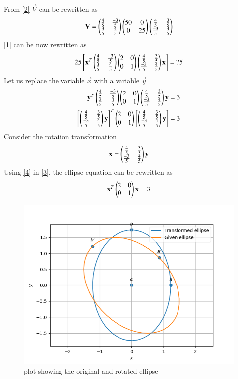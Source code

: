 \documentclass[journal,12pt,twocolumn]{IEEEtran}
\begin{document}
From \eqref{2} $\vec{V}$ can be rewritten as
\begin{align}
    \mathbf{V}=\begin{pmatrix}\frac{4}{5}&\frac{-3}{5}\\ \frac{3}{5}&\frac{4}{5}\end{pmatrix}\begin{pmatrix}50&0\\0&25\end{pmatrix}\begin{pmatrix}\frac{4}{5}&\frac{3}{5}\\ \frac{-3}{5}&\frac{4}{5}\end{pmatrix}
\end{align}
\eqref{1} can be now rewritten as
\begin{align}
25\left[\mathbf{x}^T\begin{pmatrix}\frac{4}{5}&\frac{-3}{5}\\ \frac{3}{5}&\frac{4}{5}\end{pmatrix}\begin{pmatrix}2&0\\0&1\end{pmatrix}\begin{pmatrix}\frac{4}{5}&\frac{3}{5}\\ \frac{-3}{5}&\frac{4}{5}\end{pmatrix}\mathbf{x}\right]=75
\end{align}
Let us replace the variable $\vec{x}$ with a variable $\vec{y}$
\begin{align}
  \mathbf{y}^T\begin{pmatrix}\frac{4}{5}&\frac{-3}{5}\\ \frac{3}{5}&\frac{4}{5}\end{pmatrix}\begin{pmatrix}2&0\\0&1\end{pmatrix}\begin{pmatrix}\frac{4}{5}&\frac{3}{5}\\ \frac{-3}{5}&\frac{4}{5}\end{pmatrix}\mathbf{y}= 3 \\
  \left[\begin{pmatrix}\frac{4}{5}&\frac{3}{5}\\ \frac{-3}{5}&\frac{4}{5}\end{pmatrix}\mathbf{y}\right]^T\begin{pmatrix}2&0\\0&1\end{pmatrix}\left[\begin{pmatrix}\frac{4}{5}&\frac{3}{5}\\ \frac{-3}{5}&\frac{4}{5}\end{pmatrix}\mathbf{y}\right]= 3\label{3}
\end{align}
 Consider the rotation transformation 
\begin{align}
  \mathbf{x}=\begin{pmatrix}\frac{4}{5}&\frac{3}{5}\\ \frac{-3}{5}&\frac{4}{5}\end{pmatrix}\mathbf{y}\label{4}
\end{align}
Using \eqref{4} in \eqref{3}, the ellipse equation can be rewritten as
\begin{align}
     \mathbf{x}^T\begin{pmatrix}2&0\\0&1\end{pmatrix}\mathbf{x}=3
\end{align}
\begin{figure}[!ht]
\centering
\includegraphics[width=\columnwidth]{plot.png}
\caption{plot showing the original and rotated ellipse}
\label{Fig}
\end{figure}
\end{document}
